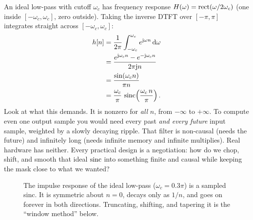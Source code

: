 \begin{whybox}
An ideal low-pass with cutoff $\omega_c$ has frequency response
$H(\omega) = \operatorname{rect}(\omega/2\omega_c)$ (one inside $[-\omega_c,\omega_c]$, zero outside).
Taking the inverse DTFT over $[-\pi,\pi]$ integrates straight across $[-\omega_c,\omega_c]$:
\begin{align*}
h[n] &= \frac{1}{2\pi}\int_{-\omega_c}^{\omega_c} e^{\mathrm{j}\omega n}\,\mathrm{d}\omega \\
     &= \frac{e^{\mathrm{j}\omega_c n} - e^{-\mathrm{j}\omega_c n}}{2\pi\mathrm{j} n} \\
     &= \frac{\sin(\omega_c n)}{\pi n} \\
     &= \frac{\omega_c}{\pi}\,\operatorname{sinc}\!\left(\frac{\omega_c\, n}{\pi}\right).
\end{align*}
Look at what this demands. It is nonzero for \emph{all} $n$, from $-\infty$ to
$+\infty$. To compute even one output sample you would need every past
\emph{and every future} input sample, weighted by a slowly decaying ripple. That
filter is non-causal (needs the future) and infinitely long (needs infinite
memory and infinite multiplies). Real hardware has neither. Every practical
design is a negotiation: how do we chop, shift, and smooth that ideal $\operatorname{sinc}$
into something finite and causal while keeping the mask close to what we wanted?
\end{whybox}

\begin{figure}[H]
\centering
{}
\caption{The impulse response of the ideal low-pass ($\omega_c = 0.3\pi$) is a
sampled sinc. It is symmetric about $n=0$, decays only as $1/n$, and goes on
forever in both directions. Truncating, shifting, and tapering it is the ``window
method'' below.}
\label{ch16:fig-ideal-sinc}
\end{figure}

